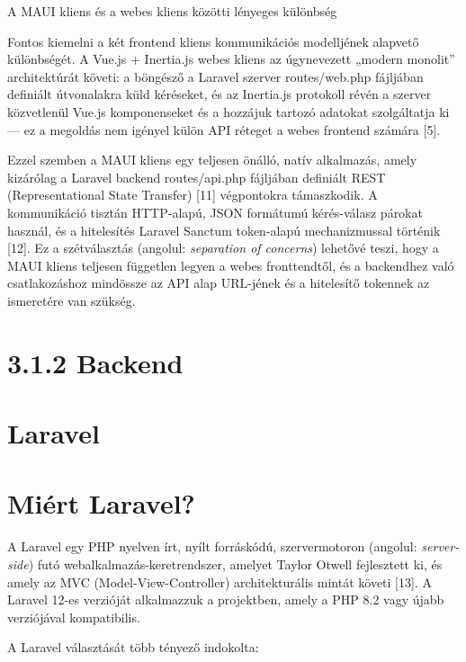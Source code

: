 A MAUI kliens és a webes kliens közötti lényeges különbség

Fontos kiemelni a két frontend kliens kommunikációs modelljének alapvető különbségét. A Vue.js + Inertia.js webes kliens az úgynevezett „modern monolit'' architektúrát követi: a böngésző a Laravel szerver routes/web.php fájljában definiált útvonalakra küld kéréseket, és az Inertia.js protokoll révén a szerver közvetlenül Vue.js komponenseket és a hozzájuk tartozó adatokat szolgáltatja ki --- ez a megoldás nem igényel külön API réteget a webes frontend számára {[}5{]}.

Ezzel szemben a MAUI kliens egy teljesen önálló, natív alkalmazás, amely kizárólag a Laravel backend routes/api.php fájljában definiált REST (Representational State Transfer) {[}11{]} végpontokra támaszkodik. A kommunikáció tisztán HTTP-alapú, JSON formátumú kérés-válasz párokat használ, és a hitelesítés Laravel Sanctum token-alapú mechanizmussal történik {[}12{]}. Ez a szétválasztás (angolul: \emph{separation of concerns}) lehetővé teszi, hogy a MAUI kliens teljesen független legyen a webes fronttendtől, és a backendhez való csatlakozáshoz mindössze az API alap URL-jének és a hitelesítő tokennek az ismeretére van szükség.

\section{3.1.2 Backend}\label{backend}

\section{Laravel}\label{laravel}

\section{Miért Laravel?}\label{miuxe9rt-laravel}

A Laravel egy PHP nyelven írt, nyílt forráskódú, szervermotoron (angolul: \emph{server-side}) futó webalkalmazás-keretrendszer, amelyet Taylor Otwell fejlesztett ki, és amely az MVC (Model-View-Controller) architekturális mintát követi {[}13{]}. A Laravel 12-es verzióját alkalmazzuk a projektben, amely a PHP 8.2 vagy újabb verziójával kompatibilis.

A Laravel választását több tényező indokolta:

